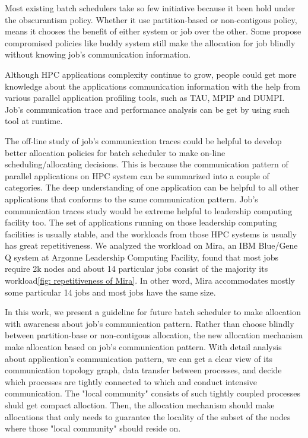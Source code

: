 \documentclass[conference]{IEEEtran}
\begin{document}
Most existing batch schedulers take so few initiative because it been hold under the obscurantism policy. Whether it use partition-based or non-contigous policy, means it chooses the benefit of either system or job over the other. Some propose compromised policies like buddy system\cite{buddy system paper} still make the allocation for job blindly without knowing job's communication information. 

Although HPC applications complexity continue to grow, people could get more knowledge about the applications communication information with the help from various parallel application profiling tools, such as TAU\cite{tau}, MPIP\cite{mpip} and DUMPI\cite{sst}. Job's communication trace and performance analysis can be get by using such tool at runtime. 

The off-line study of job's communication traces could be helpful to develop better allocation policies for batch scheduler to make on-line scheduling/allocating decisions. This is because the communication pattern of parallel applications on HPC system can be summarized into a couple of categories\cite{hpdc2015-ornl}. The deep understanding of one application can be helpful to all other applications that conforms to the same communication pattern. Job's communication traces study would be extreme helpful to leadership computing facility too. The set of applications running on those leadership computing facilities is usually stable, and the workloads from those HPC systems is usually has great repetitiveness. We analyzed the workload on Mira, an IBM Blue/Gene Q system at Argonne Leadership Computing Facility, found that most jobs require 2k nodes and about 14 particular jobs consist of the majority its workload\ref{fig: repetitiveness of Mira}. In other word, Mira accommodates mostly some particular 14 jobs and most jobs have the same size.


In this work, we present a guideline for future batch scheduler to make allocation with awareness about job's communication pattern. Rather than choose blindly between partition-base or non-contigous allocation, the new allocation mechanism make allocation based on job's communication pattern. With detail analysis about application's communication pattern, we can get a clear view of its communication topology graph, data transfer between processes, and decide which processes are tightly connected to which and conduct intensive communication. The "local community" consists of such tightly coupled processes shuld get compact alloction. Then, the allocation mechanism should make allocations that only needs to guarantee the locality of the subset of the nodes where those "local community" should reside on.
\end{document}
